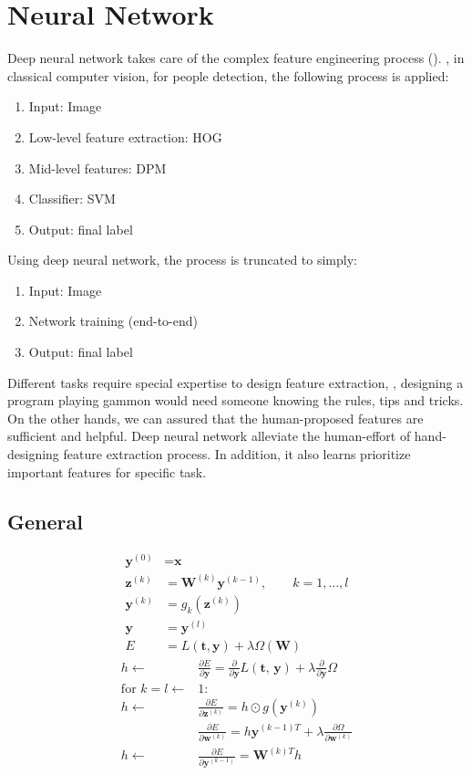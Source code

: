 \chapter{Neural Network}
Deep neural network takes care of the complex feature engineering process (). \Eg, in classical computer vision, for people detection, the following process is applied:
\begin{enumerate}
	\item Input: Image
	\item Low-level feature extraction: \ac{HOG}
	\item Mid-level features: \ac{DPM}
	\item Classifier: \ac{SVM}
	\item Output: final label
\end{enumerate}
Using deep neural network, the process is truncated to simply:
\begin{enumerate}
	\item Input: Image
	\item Network training (end-to-end)
	\item Output: final label
\end{enumerate}
Different tasks require special expertise to design feature extraction, \eg, designing a program playing gammon would need someone knowing the rules, tips and tricks. On the other hands, we can assured that the human-proposed features are sufficient and helpful. Deep neural network alleviate the human-effort of hand-designing feature extraction process. In addition, it also learns prioritize important features for specific task.

\section{General}
\begin{align}
	\textbf{y}^{(0)} &= \textbf{x}\\
	\textbf{z}^{(k)} &= \textbf{W}^{(k)}\textbf{y}^{(k-1)}, \qquad k = 1, \dots, l\\
	\textbf{y}^{(k)} &= g_k(\textbf{z}^{(k)})\\
	\textbf{y} &= \textbf{y}^{(l)}\\
	E &= L(\textbf{t}, \textbf{y}) + \lambda \Omega(\textbf{W})
\end{align}
\begin{align}
	h \leftarrow &\frac{\partial E}{\partial \textbf{y}} = \frac{\partial}{\partial \textbf{y}} L(\textbf{t, y}) + \lambda \frac{\partial}{\partial \textbf{y}} \Omega\\
	\text{for } k =l \leftarrow &1:\\
	h \leftarrow &\frac{\partial E}{\partial \textbf{z}^{(k)}} = h \odot g(\textbf{y}^{(k)})\\
	&\frac{\partial E}{\partial \textbf{w}^{(k)}} = h \textbf{y}^{(k-1)T} + \lambda \frac{\partial \Omega}{\partial \textbf{w}^{(k)}}\\
	h \leftarrow &\frac{\partial E}{\partial \textbf{y}^{(k-1)}} = \textbf{W}^{(k)T} h
\end{align}

